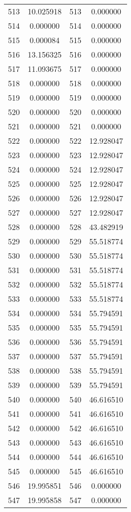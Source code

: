 \documentclass[12pt]{article}
\begin{document}
\begin{longtable}{@{}cccc@{}}
513 & 10.025918 & 513 & 0.000000 \\
514 & 0.000000 & 514 & 0.000000 \\
515 & 0.000084 & 515 & 0.000000 \\
516 & 13.156325 & 516 & 0.000000 \\
517 & 11.093675 & 517 & 0.000000 \\
518 & 0.000000 & 518 & 0.000000 \\
519 & 0.000000 & 519 & 0.000000 \\
520 & 0.000000 & 520 & 0.000000 \\
521 & 0.000000 & 521 & 0.000000 \\
522 & 0.000000 & 522 & 12.928047 \\
523 & 0.000000 & 523 & 12.928047 \\
524 & 0.000000 & 524 & 12.928047 \\
525 & 0.000000 & 525 & 12.928047 \\
526 & 0.000000 & 526 & 12.928047 \\
527 & 0.000000 & 527 & 12.928047 \\
528 & 0.000000 & 528 & 43.482919 \\
529 & 0.000000 & 529 & 55.518774 \\
530 & 0.000000 & 530 & 55.518774 \\
531 & 0.000000 & 531 & 55.518774 \\
532 & 0.000000 & 532 & 55.518774 \\
533 & 0.000000 & 533 & 55.518774 \\
534 & 0.000000 & 534 & 55.794591 \\
535 & 0.000000 & 535 & 55.794591 \\
536 & 0.000000 & 536 & 55.794591 \\
537 & 0.000000 & 537 & 55.794591 \\
538 & 0.000000 & 538 & 55.794591 \\
539 & 0.000000 & 539 & 55.794591 \\
540 & 0.000000 & 540 & 46.616510 \\
541 & 0.000000 & 541 & 46.616510 \\
542 & 0.000000 & 542 & 46.616510 \\
543 & 0.000000 & 543 & 46.616510 \\
544 & 0.000000 & 544 & 46.616510 \\
545 & 0.000000 & 545 & 46.616510 \\
546 & 19.995851 & 546 & 0.000000 \\
547 & 19.995858 & 547 & 0.000000 \\

\end{longtable}
\end{document}
